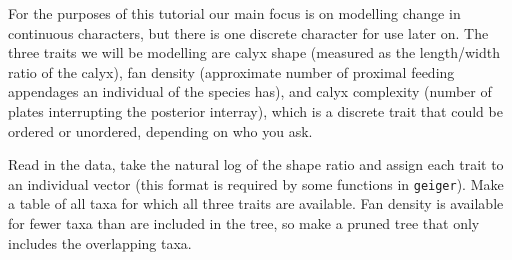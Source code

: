 \documentclass[]{article}
\newenvironment{Shaded}{\begin{snugshade}}{\end{snugshade}}
\newcommand{\KeywordTok}[1]{\textcolor[rgb]{0.13,0.29,0.53}{\textbf{#1}}}
\newcommand{\DecValTok}[1]{\textcolor[rgb]{0.00,0.00,0.81}{#1}}
\newcommand{\FloatTok}[1]{\textcolor[rgb]{0.00,0.00,0.81}{#1}}
\newcommand{\StringTok}[1]{\textcolor[rgb]{0.31,0.60,0.02}{#1}}
\newcommand{\OperatorTok}[1]{\textcolor[rgb]{0.81,0.36,0.00}{\textbf{#1}}}
\newcommand{\NormalTok}[1]{#1}
\begin{document}
\begin{Shaded}
\end{Shaded}

For the purposes of this tutorial our main focus is on modelling change
in continuous characters, but there is one discrete character for use
later on. The three traits we will be modelling are calyx shape
(measured as the length/width ratio of the calyx), fan density
(approximate number of proximal feeding appendages an individual of the
species has), and calyx complexity (number of plates interrupting the
posterior interray), which is a discrete trait that could be ordered or
unordered, depending on who you ask.

Read in the data, take the natural log of the shape ratio and assign
each trait to an individual vector (this format is required by some
functions in \texttt{geiger}). Make a table of all taxa for which all
three traits are available. Fan density is available for fewer taxa than
are included in the tree, so make a pruned tree that only includes the
overlapping taxa.
\end{document}
